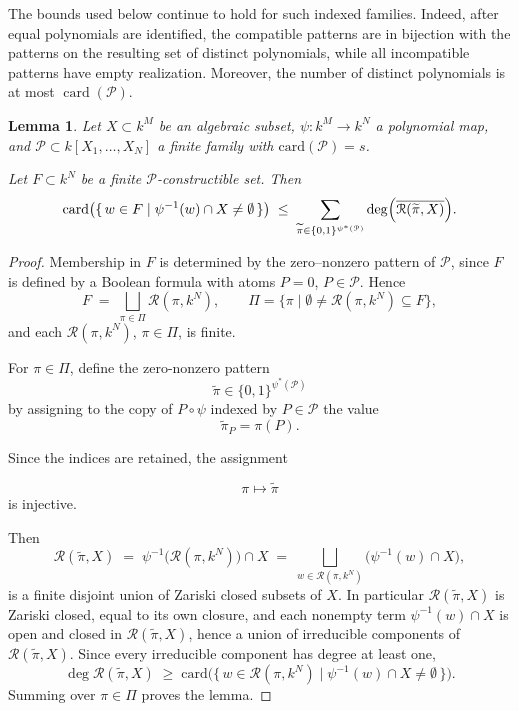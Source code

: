\documentclass[10pt]{amsart}
\newtheorem{lemma}{Lemma}[section]
\theoremstyle{definition}
\theoremstyle{remark}
\numberwithin{equation}{section}
\newcommand {\RR} {{\mathcal R}}
\newcommand{\card}{\mathrm{card}}
\begin{document}
The bounds used below continue to hold for such indexed families. Indeed, after equal polynomials are identified, the compatible patterns are in bijection with the patterns on the resulting set of distinct polynomials, while all incompatible patterns have empty realization. Moreover, the number of distinct polynomials is at most \(\operatorname{card}(\mathcal P)\).

\begin{lemma}
\label{lem:fiber}
Let $X \subset k^M$ be an algebraic subset, $\psi\colon k^M \to k^N$ a
polynomial map, and $\mathcal{P} \subset k[X_1,\dots,X_N]$ a finite family with
$\card(\mathcal{P}) = s$. 


Let $F \subset k^N$ be a finite
$\mathcal{P}$-constructible set. Then
\[
\card\bigl(\{\,w \in F \mid \psi^{-1}(w) \cap X \neq \emptyset\,\}\bigr)
\;\le\;
\sum_{\widetilde\pi \in \{0,1\}^{\psi^*(\mathcal{P})}}
\deg\Bigl(\overline{\RR(\widetilde\pi, X)}\Bigr).
\]
\end{lemma}

\begin{proof}
Membership in $F$ is determined by the zero--nonzero pattern of $\mathcal{P}$, since
$F$ is defined by a Boolean formula with atoms $P = 0$, $P \in \mathcal{P}$. Hence
\[
F \;=\; \bigsqcup_{\pi \in \Pi} \RR(\pi, k^N),
\qquad
\Pi = \{\pi \mid \emptyset \neq \RR(\pi,k^N) \subseteq F\},
\]
and each $\RR(\pi, k^N)$, $\pi \in \Pi$, is finite. 

For \(\pi\in\Pi\), define the zero-nonzero pattern
$$
\widetilde\pi\in\{0,1\}^{\psi^*(\mathcal P)}
$$
by assigning to the copy of \(P\circ\psi\) indexed by \(P\in\mathcal P\) the value
$$
\widetilde\pi_P=\pi(P).
$$

Since the indices are retained, the assignment

$$
\pi\longmapsto\widetilde\pi
$$
is injective. 


Then
\[
\RR(\widetilde\pi, X)
\;=\;
\psi^{-1}\bigl(\RR(\pi, k^N)\bigr) \cap X
\;=\;
\bigsqcup_{w \in \RR(\pi,k^N)} \bigl(\psi^{-1}(w) \cap X\bigr),
\]
is a finite disjoint union of Zariski closed subsets of $X$. In particular
$\RR(\widetilde\pi, X)$ is Zariski closed, equal to its own closure, and each
nonempty term $\psi^{-1}(w) \cap X$ is open and closed in
$\RR(\widetilde\pi,X)$, hence a union of irreducible components of
$\RR(\widetilde\pi,X)$. Since every irreducible component has degree at least
one,
\[
\deg \RR(\widetilde\pi, X) \;\ge\;
\card\bigl(\{\,w \in \RR(\pi,k^N) \mid \psi^{-1}(w) \cap X \neq
\emptyset\,\}\bigr).
\]
Summing over $\pi \in \Pi$ proves the lemma. 
\end{proof}
\end{document}
